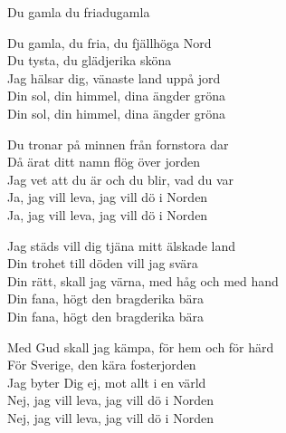 \begin{song}{Du gamla du fria}{dugamla}
\begin{vers}
Du gamla, du fria, du fjällhöga Nord\\
Du tysta, du glädjerika sköna\\
Jag hälsar dig, vänaste land uppå jord\\
Din sol, din himmel, dina ängder gröna\\
Din sol, din himmel, dina ängder gröna\\
\end{vers}
\begin{vers}
Du tronar på minnen från fornstora dar\\
Då ärat ditt namn flög över jorden\\
Jag vet att du är och du blir, vad du var\\
Ja, jag vill leva, jag vill dö i Norden\\
Ja, jag vill leva, jag vill dö i Norden\\
\end{vers}
\begin{vers}
Jag städs vill dig tjäna mitt älskade land\\
Din trohet till döden vill jag svära\\
Din rätt, skall jag värna, med håg och med hand\\
Din fana, högt den bragderika bära\\
Din fana, högt den bragderika bära\\
\end{vers}
\begin{vers}
Med Gud skall jag kämpa, för hem och för härd\\
För Sverige, den kära fosterjorden\\
Jag byter Dig ej, mot allt i en värld\\
Nej, jag vill leva, jag vill dö i Norden\\
Nej, jag vill leva, jag vill dö i Norden\\
\end{vers}
\end{song}
